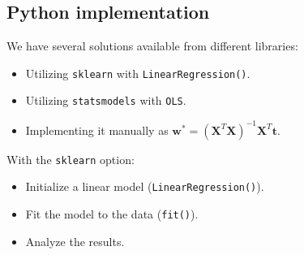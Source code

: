 \subsection{Python implementation}
We have several solutions available from different libraries:
\begin{itemize}
    \item Utilizing \texttt{sklearn} with \texttt{LinearRegression()}.
    \item Utilizing \texttt{statsmodels} with \texttt{OLS}.
    \item Implementing it manually as $\textbf{w}^\ast=\left(\textbf{X}^T\textbf{X}\right)^{-1}\textbf{X}^T\textbf{t}$.
\end{itemize}
With the \texttt{sklearn} option:
\begin{itemize}
    \item Initialize a linear model (\texttt{LinearRegression()}).
    \item Fit the model to the data (\texttt{fit()}).
    \item Analyze the results.
\end{itemize}